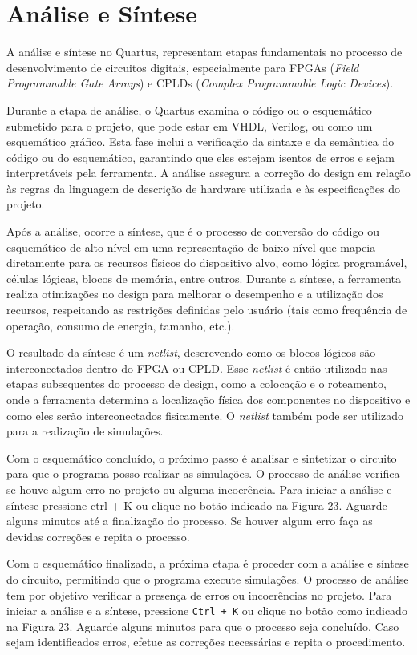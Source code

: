 \documentclass[12pt,a4paper]{article}
\begin{document}
\section{Análise e Síntese}

A análise e síntese no Quartus, representam etapas fundamentais no processo de desenvolvimento de circuitos digitais, especialmente para FPGAs (\textit{Field Programmable Gate Arrays}) e CPLDs (\textit{Complex Programmable Logic Devices}).

Durante a etapa de análise, o Quartus examina o código ou o esquemático submetido para o projeto, que pode estar em VHDL, Verilog, ou como um esquemático gráfico. Esta fase inclui a verificação da sintaxe e da semântica do código ou do esquemático, garantindo que eles estejam isentos de erros e sejam interpretáveis pela ferramenta. A análise assegura a correção do design em relação às regras da linguagem de descrição de hardware utilizada e às especificações do projeto.

Após a análise, ocorre a síntese, que é o processo de conversão do código ou esquemático de alto nível em uma representação de baixo nível que mapeia diretamente para os recursos físicos do dispositivo alvo, como lógica programável, células lógicas, blocos de memória, entre outros. Durante a síntese, a ferramenta realiza otimizações no design para melhorar o desempenho e a utilização dos recursos, respeitando as restrições definidas pelo usuário (tais como frequência de operação, consumo de energia, tamanho, etc.).

O resultado da síntese é um \textit{netlist}, descrevendo como os blocos lógicos são interconectados dentro do FPGA ou CPLD. Esse \textit{netlist} é então utilizado nas etapas subsequentes do processo de design, como a colocação e o roteamento, onde a ferramenta determina a localização física dos componentes no dispositivo e como eles serão interconectados fisicamente. O \textit{netlist} também pode ser utilizado para a realização de simulações.

Com o esquemático concluído, o próximo passo é analisar e sintetizar o circuito para que o programa posso realizar as simulações. O processo de análise verifica se houve algum erro no projeto ou alguma incoerência. Para iniciar a análise e síntese pressione ctrl + K ou clique no botão indicado na Figura 23. Aguarde alguns minutos até a finalização do processo. Se houver algum erro faça as devidas correções e repita o processo.

Com o esquemático finalizado, a próxima etapa é proceder com a análise e síntese do circuito, permitindo que o programa execute simulações. O processo de análise tem por objetivo verificar a presença de erros ou incoerências no projeto. Para iniciar a análise e a síntese, pressione \texttt{Ctrl + K} ou clique no botão como indicado na Figura 23. Aguarde alguns minutos para que o processo seja concluído. Caso sejam identificados erros, efetue as correções necessárias e repita o procedimento.





\newpage
\end{document}
